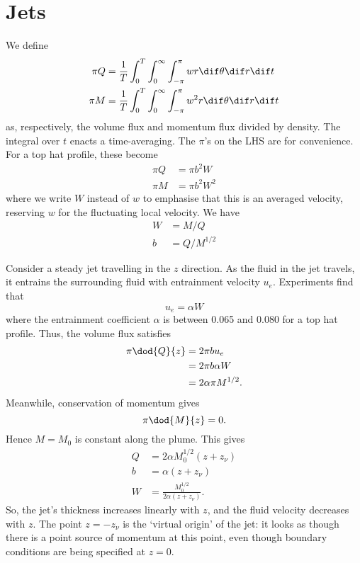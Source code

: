 \section{Jets}

We define 
\begin{align}
 \pi Q	&= \frac{1}{T}\int_0^T \int_0^\infty \int_{-\pi}^\pi w r \dif \theta\dif r \dif t \\ 
 \pi M	&= \frac{1}{T}\int_0^T \int_0^\infty \int_{-\pi}^\pi w^2 r \dif \theta\dif r \dif t \\  
\end{align}
as, respectively, the volume flux and momentum flux divided by density. The
integral over $t$ enacts a time-averaging. The $\pi$'s on the LHS are for
convenience. For a top hat profile, these become
\begin{align}
 \pi Q	&= \pi b^2 W \\
 \pi M	&= \pi b^2 W^2 
\end{align}
where we write $W$ instead of $w$ to emphasise that this is an averaged
velocity, reserving $w$ for the fluctuating local velocity. We have
\begin{align}
 W	&= M/Q \\
 b	&= Q/M^{1/2}
\end{align}

Consider a steady jet travelling in the $z$ direction. As the fluid in the jet
travels, it entrains the surrounding fluid with entrainment velocity $u_e$.
Experiments find that
\begin{equation}
 u_e = \alpha W 
\end{equation} 
where the entrainment coefficient $\alpha$ is between 0.065 and 0.080 for a top
hat profile. Thus, the volume flux satisfies
\begin{align}
 \pi \dod{Q}{z}	&= 2\pi b u_e \\
 			&= 2\pi b \alpha W \\
			&= 2\alpha\pi M^{1/2}.
\end{align}
Meanwhile, conservation of momentum gives
\begin{equation}
 \pi \dod{M}{z} = 0.
\end{equation}
Hence $M = M_0$ is constant along the plume. This gives
\begin{align}
 Q 	&= 2\alpha M_0^{1/2} (z+z_\nu) \\
 b	&= \alpha (z+z_\nu) \\
 W	&= \frac{M_0^{1/2}} {2\alpha (z+z_\nu)}.
\end{align}
So, the jet's thickness increases linearly with $z$, and the fluid velocity decreases with $z$. The point $z = -z_\nu$ is the `virtual origin' of the jet: it looks as though there is a point source of momentum at this point, even though boundary conditions are being specified at $z=0$. 
